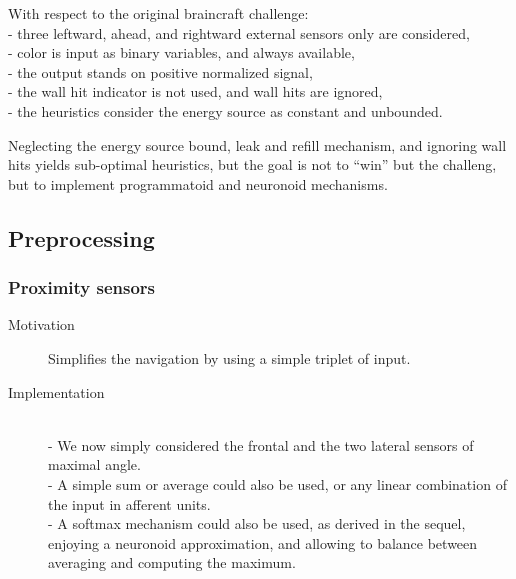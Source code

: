 \documentclass[a4]{article} \usepackage[left=2cm,right=3cm,top=1cm,bottom=2cm]{geometry}
\newcommand{\tab}{\hphantom{4mm}}
\begin{document}
With respect to the original braincraft challenge:
\\ \tab - three leftward, ahead, and rightward external sensors only are considered,
\\ \tab - color is input as binary variables, and always available,
\\ \tab - the output stands on positive normalized signal,
\\ \tab - the wall hit indicator is not used, and wall hits are ignored,
\\ \tab - the heuristics consider the energy source as constant and unbounded.

Neglecting the energy source bound, leak and refill mechanism, and ignoring wall hits yields sub-optimal heuristics, but the goal is not to ``win'' but the challeng, but to implement programmatoid and neuronoid mechanisms.

\subsection{Preprocessing}

\subsubsection{Proximity sensors}\begin{description}
\item[Motivation] Simplifies the navigation by using a simple triplet of input.
\item[Implementation] ~
\\- We now simply considered the frontal and the two lateral sensors of maximal angle.
\\- A simple sum or average could also be used, or  any linear combination of the input in afferent units. 
 \\- A softmax mechanism could also be used, as derived in the sequel, enjoying a neuronoid approximation,
 and allowing to balance between averaging and computing the maximum.
 \end{description}
\end{document}
